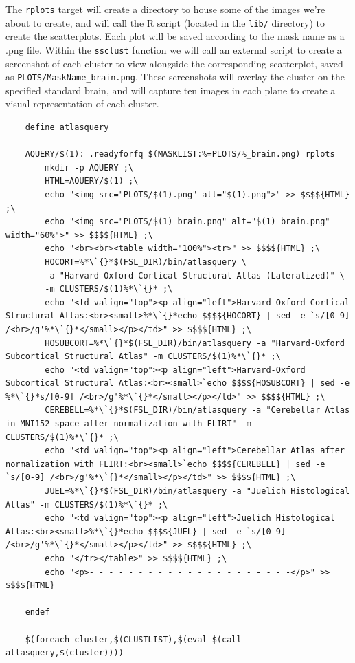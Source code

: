 The \texttt{rplots} target will create a directory to house some of the images we're about to create, and will call the R script (located in the \texttt{lib/} directory) to create the scatterplots. Each plot will be saved according to the mask name as a .png file.  Within the \texttt{ssclust} function we will call an external script to create a screenshot of each cluster to view alongside the corresponding scatterplot, saved as \texttt{PLOTS/MaskName_brain.png}. These screenshots will overlay the cluster on the specified standard brain, and will capture ten images in each plane to create a visual representation of each cluster.

\begin{lstlisting}
	define atlasquery
	
	AQUERY/$(1): .readyforfq $(MASKLIST:%=PLOTS/%_brain.png) rplots
		mkdir -p AQUERY ;\
		HTML=AQUERY/$(1) ;\
		echo "<img src="PLOTS/$(1).png" alt="$(1).png">" >> $$$${HTML} ;\
		echo "<img src="PLOTS/$(1)_brain.png" alt="$(1)_brain.png" width="60%">" >> $$$${HTML} ;\
		echo "<br><br><table width="100%"><tr>" >> $$$${HTML} ;\
		HOCORT=%*\`{}*$(FSL_DIR)/bin/atlasquery \
		-a "Harvard-Oxford Cortical Structural Atlas (Lateralized)" \
		-m CLUSTERS/$(1)%*\`{}* ;\
		echo "<td valign="top"><p align="left">Harvard-Oxford Cortical Structural Atlas:<br><small>%*\`{}*echo $$$${HOCORT} | sed -e `s/[0-9] /<br>/g'%*\`{}*</small></p></td>" >> $$$${HTML} ;\
		HOSUBCORT=%*\`{}*$(FSL_DIR)/bin/atlasquery -a "Harvard-Oxford Subcortical Structural Atlas" -m CLUSTERS/$(1)%*\`{}* ;\
		echo "<td valign="top"><p align="left">Harvard-Oxford Subcortical Structural Atlas:<br><small>`echo $$$${HOSUBCORT} | sed -e %*\`{}*s/[0-9] /<br>/g'%*\`{}*</small></p></td>" >> $$$${HTML} ;\
		CEREBELL=%*\`{}*$(FSL_DIR)/bin/atlasquery -a "Cerebellar Atlas in MNI152 space after normalization with FLIRT" -m CLUSTERS/$(1)%*\`{}* ;\
		echo "<td valign="top"><p align="left">Cerebellar Atlas after normalization with FLIRT:<br><small>`echo $$$${CEREBELL} | sed -e `s/[0-9] /<br>/g'%*\`{}*</small></p></td>" >> $$$${HTML} ;\
		JUEL=%*\`{}*$(FSL_DIR)/bin/atlasquery -a "Juelich Histological Atlas" -m CLUSTERS/$(1)%*\`{}* ;\
		echo "<td valign="top"><p align="left">Juelich Histological Atlas:<br><small>%*\`{}*echo $$$${JUEL} | sed -e `s/[0-9] /<br>/g'%*\`{}*</small></p></td>" >> $$$${HTML} ;\
		echo "</tr></table>" >> $$$${HTML} ;\
		echo "<p>- - - - - - - - - - - - - - - - - - - - -</p>" >> $$$${HTML}
				
	endef
	
	$(foreach cluster,$(CLUSTLIST),$(eval $(call atlasquery,$(cluster))))
\end{lstlisting}

